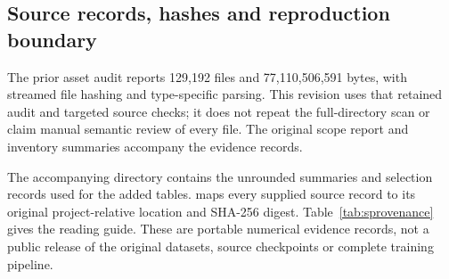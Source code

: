 \documentclass[11pt,a4paper]{article}
\begin{document}
\subsection{Source records, hashes and reproduction boundary}
The prior asset audit reports 129,192 files and 77,110,506,591 bytes, with streamed file hashing and type-specific parsing. This revision uses that retained audit and targeted source checks; it does not repeat the full-directory scan or claim manual semantic review of every file. The original scope report and inventory summaries accompany the evidence records.

The accompanying  directory contains the unrounded summaries and selection records used for the added tables.  maps every supplied source record to its original project-relative location and SHA-256 digest. Table~\ref{tab:sprovenance} gives the reading guide. These are portable numerical evidence records, not a public release of the original datasets, source checkpoints or complete training pipeline.
\end{document}
